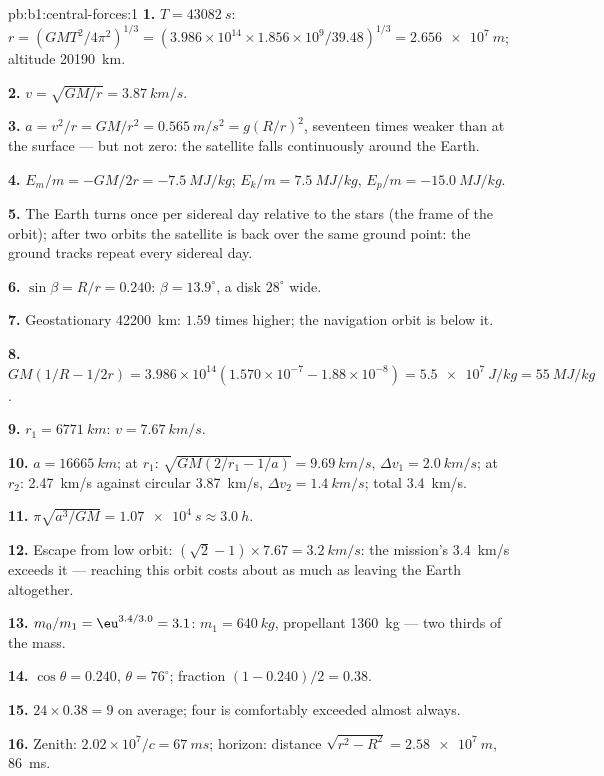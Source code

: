 \begin{solution}{pb:b1:central-forces:1}
\textbf{1.} $T = \qty{43082}{s}$: $r = (GMT^2/4\pi^2)^{1/3} = (3.986\times10^{14}
\times 1.856\times10^9/39.48)^{1/3} = \qty{2.656e7}{m}$; altitude
\qty{20190}{km}.

\textbf{2.} $v = \sqrt{GM/r} = \qty{3.87}{km/s}$.

\textbf{3.} $a = v^2/r = GM/r^2 = \qty{0.565}{m/s^2} = g(R/r)^2$, seventeen
times weaker than at the surface --- but not zero: the satellite falls
continuously around the Earth.

\textbf{4.} $E_m/m = -GM/2r = \qty{-7.5}{MJ/kg}$; $E_k/m = \qty{+7.5}{MJ/kg}$,
$E_p/m = \qty{-15.0}{MJ/kg}$.

\textbf{5.} The Earth turns once per sidereal day relative to the stars
(the frame of the orbit); after two orbits the satellite is back over
the same ground point: the ground tracks repeat every sidereal day.

\textbf{6.} $\sin\beta = R/r = 0.240$: $\beta = 13.9^\circ$, a disk
$28^\circ$ wide.

\textbf{7.} Geostationary \qty{42200}{km}: $1.59$ times higher; the
navigation orbit is below it.

\textbf{8.} $GM(1/R - 1/2r) = 3.986\times10^{14}(1.570\times10^{-7} - 1.88\times
10^{-8}) = \qty{5.5e7}{J/kg} = \qty{55}{MJ/kg}$.

\textbf{9.} $r_1 = \qty{6771}{km}$: $v = \qty{7.67}{km/s}$.

\textbf{10.} $a = \qty{16665}{km}$; at $r_1$: $\sqrt{GM(2/r_1 - 1/a)} =
\qty{9.69}{km/s}$, $\Delta v_1 = \qty{2.0}{km/s}$; at $r_2$: \qty{2.47}{km/s}
against circular \qty{3.87}{km/s}, $\Delta v_2 = \qty{1.4}{km/s}$; total
\qty{3.4}{km/s}.

\textbf{11.} $\pi\sqrt{a^3/GM} = \qty{1.07e4}{s} \approx \qty{3.0}{h}$.

\textbf{12.} Escape from low orbit: $(\sqrt2 - 1)\times 7.67 = \qty{3.2}{km/s}$:
the mission's \qty{3.4}{km/s} exceeds it --- reaching this orbit costs
about as much as leaving the Earth altogether.

\textbf{13.} $m_0/m_1 = \eu^{3.4/3.0} = 3.1$: $m_1 = \qty{640}{kg}$,
propellant \qty{1360}{kg} --- two thirds of the mass.

\textbf{14.} $\cos\theta = 0.240$, $\theta = 76^\circ$; fraction $(1 - 0.240)/2
= 0.38$.

\textbf{15.} $24 \times 0.38 = 9$ on average; four is comfortably
exceeded almost always.

\textbf{16.} Zenith: $2.02\times10^7/c = \qty{67}{ms}$; horizon: distance
$\sqrt{r^2 - R^2} = \qty{2.58e7}{m}$, \qty{86}{ms}.


\end{solution}
